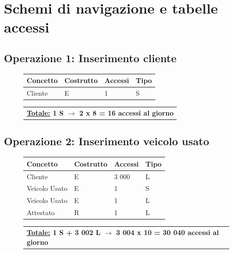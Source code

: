 \documentclass[a4paper,12pt]{report}
\begin{document}
\section{Schemi di navigazione e tabelle accessi}
\subsection*{Operazione 1: Inserimento cliente}
\begin{figure}[ht]
	\centering
	\begin{tabular}{L{3cm}C{2cm}C{4.5cm}C{2cm}}
		\rule[-1.5mm]{0mm}{0.60cm}{}
		\textbf{Concetto} & \textbf{Costrutto} &\textbf{Accessi} & \textbf{Tipo} \\	
		\hline\rule[-2mm]{0mm}{0.65cm}{}
		Cliente & E & 1 & S \\
	\end{tabular}
	
	\begin{tabular}{C{13.9cm}}
		\rule[-3mm]{0mm}{0.85cm}{}	
		 \textbf{\underline{Totale:} 1 S $\to$ 2 x 8 = 16 accessi al giorno}
	\end{tabular}
\end{figure}

\subsection*{Operazione 2: Inserimento veicolo usato}
\begin{figure}[ht]
	\centering
	\begin{tabular}{L{3cm}C{2cm}C{4.5cm}C{2cm}}
		\rule[-2mm]{0mm}{0.6cm}{}
		\textbf{Concetto} & \textbf{Costrutto} &\textbf{Accessi} & \textbf{Tipo} \\
		\hline\rule[-2mm]{0mm}{0.65cm}{}
		Cliente & E & 3 000 & L \\
		\hline\rule[-2mm]{0mm}{0.65cm}{}
		Veicolo Usato & E & 1 & S \\
		\hline\rule[-2mm]{0mm}{0.65cm}{}
		Veicolo Usato & E & 1 & L \\
		\hline\rule[-2mm]{0mm}{0.65cm}{}
		Attestato & R & 1 & L \\
	\end{tabular}
	
	\begin{tabular}{C{13.9cm}}
		\rule[-3mm]{0mm}{0.85cm}{}	
		 \textbf{\underline{Totale:} 1 S + 3 002 L $\to$ 3 004 x 10 = 30 040 accessi al giorno}
	\end{tabular}
\end{figure}
\end{document}
